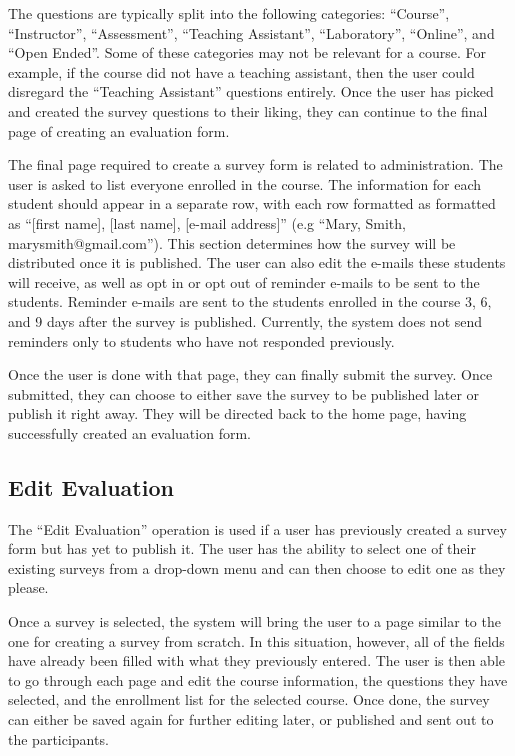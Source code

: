 \documentclass{article}
\begin{document}
The questions are typically split into the following categories: ``Course'', ``Instructor'', ``Assessment'', ``Teaching Assistant'', ``Laboratory'', ``Online'', and ``Open Ended''. Some of these categories may not be relevant for a course. For example, if the course did not have a teaching assistant, then the user could disregard the ``Teaching Assistant'' questions entirely. Once the user has picked and created the survey questions to their liking, they can continue to the final page of creating an evaluation form.

The final page required to create a survey form is related to administration. The user is asked to list everyone enrolled in the course. The information for each student should appear in a separate row, with each row formatted as formatted as ``[first name], [last name], [e-mail address]'' (e.g ``Mary, Smith, marysmith@gmail.com''). This section determines how the survey will be distributed once it is published. The user can also edit the e-mails these students will receive, as well as opt in or opt out of reminder e-mails to be sent to the students. Reminder e-mails are sent to the students enrolled in the course 3, 6, and 9 days after the survey is published. Currently, the system does not send reminders only to students who have not responded previously.

Once the user is done with that page, they can finally submit the survey. Once submitted, they can choose to either save the survey to be published later or publish it right away. They will be directed back to the home page, having successfully created an evaluation form.

\subsection{Edit Evaluation}

The ``Edit Evaluation'' operation is used if a user has previously created a survey form but has yet to publish it. The user has the ability to select one of their existing surveys from a drop-down menu and can then choose to edit one as they please.

Once a survey is selected, the system will bring the user to a page similar to the one for creating a survey from scratch. In this situation, however, all of the fields have already been filled with what they previously entered. The user is then able to go through each page and edit the course information, the questions they have selected, and the enrollment list for the selected course. Once done, the survey can either be saved again for further editing later, or published and sent out to the participants.
\end{document}
